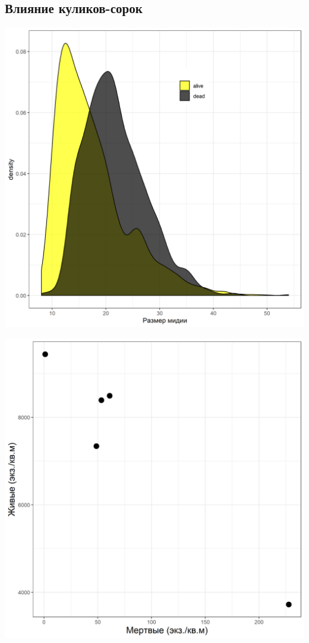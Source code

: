 \documentclass[a0,portrait]{a0poster}
\begin{document}
\begin{multicols}{2}
\subsection*{Влияние куликов-сорок}



%
\begin{minipage}[t]{0.46\linewidth}		
	\begin{center}\vspace{0.1cm}
			\includegraphics[width=0.9\linewidth]{Size_dist_hem.png}
			\label{Fig_siz_hem}
		\end{center}\vspace{0.5cm}
\end{minipage}\hspace{1cm}
%
\begin{minipage}[t]{0.46\linewidth}		
	\begin{center}\vspace{0.1cm}
			\includegraphics[width=0.9\linewidth]{N_dead_N_alive_hem.png}

\end{center}
\end{minipage}
\end{multicols}
\end{document}

